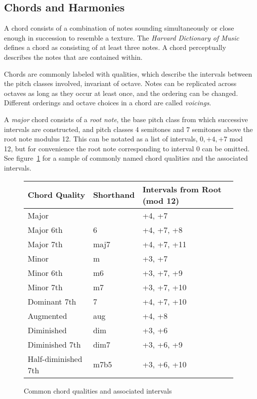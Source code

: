 \subsection{Chords and Harmonies}

A chord consists of a combination of notes sounding simultaneously or close enough in succession to resemble a texture. The \textit{Harvard Dictionary of Music} defines a chord as consisting of at least three notes\cite{harvdict}. A chord perceptually describes the notes that are contained within.

Chords are commonly labeled with qualities, which describe the intervals between the pitch classes involved, invariant of octave. Notes can be replicated across octaves as long as they occur at least once, and the ordering can be changed. Different orderings and octave choices in a chord are called \textit{voicings}.

A \textit{major} chord consists of a \textit{root note}, the base pitch class from which successive intervals are constructed, and pitch classes 4 semitones and 7 semitones above the root note modulus 12. This can be notated as a list of intervals, $0, +4, +7$ mod 12, but for convenience the root note corresponding to interval $0$ can be omitted. See figure~\ref{fig:qualitytable} for a sample of commonly named chord qualities and the associated intervals. \\

\begin{figure}[h!]
\centering
\begin{tabular}{lll}
\toprule
Chord Quality       & Shorthand & Intervals from Root (mod 12) \\
\midrule
Major               &           & +4, +7     \\
Major 6th           & 6         & +4, +7, +8 \\
Major 7th           & maj7      & +4, +7, +11\\
Minor               & m         & +3, +7     \\
Minor 6th           & m6        & +3, +7, +9 \\
Minor 7th           & m7        & +3, +7, +10\\
Dominant 7th        & 7         & +4, +7, +10\\
Augmented           & aug       & +4, +8     \\
Diminished          & dim       & +3, +6     \\
Diminished 7th      & dim7      & +3, +6, +9 \\
Half-diminished 7th & m7b5      & +3, +6, +10\\
\bottomrule
\end{tabular}
\caption{Common chord qualities and associated intervals}
\label{fig:qualitytable}
\end{figure}

